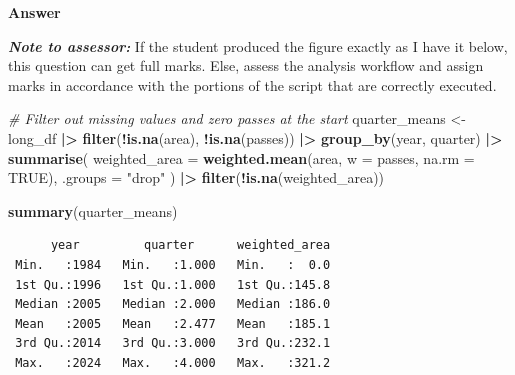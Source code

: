 \documentclass[
  british,
  10pt,
]{article}
\newenvironment{Shaded}{\begin{snugshade}}{\end{snugshade}}
\newcommand{\AttributeTok}[1]{\textcolor[rgb]{0.13,0.29,0.53}{#1}}
\newcommand{\CommentTok}[1]{\textcolor[rgb]{0.56,0.35,0.01}{\textit{#1}}}
\newcommand{\ConstantTok}[1]{\textcolor[rgb]{0.56,0.35,0.01}{#1}}
\newcommand{\FunctionTok}[1]{\textcolor[rgb]{0.13,0.29,0.53}{\textbf{#1}}}
\newcommand{\NormalTok}[1]{#1}
\newcommand{\OtherTok}[1]{\textcolor[rgb]{0.56,0.35,0.01}{#1}}
\newcommand{\SpecialCharTok}[1]{\textcolor[rgb]{0.81,0.36,0.00}{\textbf{#1}}}
\newcommand{\StringTok}[1]{\textcolor[rgb]{0.31,0.60,0.02}{#1}}
\begin{document}
\textbf{Answer}

\textbf{\emph{Note to assessor:}} If the student produced the figure
exactly as I have it below, this question can get full marks. Else,
assess the analysis workflow and assign marks in accordance with the
portions of the script that are correctly executed.

\begin{Shaded}
\begin{Highlighting}[]
\CommentTok{\# Filter out missing values and zero passes at the start}
\NormalTok{quarter\_means }\OtherTok{\textless{}{-}}\NormalTok{ long\_df }\SpecialCharTok{|\textgreater{}} 
  \FunctionTok{filter}\NormalTok{(}\SpecialCharTok{!}\FunctionTok{is.na}\NormalTok{(area), }\SpecialCharTok{!}\FunctionTok{is.na}\NormalTok{(passes)) }\SpecialCharTok{|\textgreater{}} 
  \FunctionTok{group\_by}\NormalTok{(year, quarter) }\SpecialCharTok{|\textgreater{}} 
  \FunctionTok{summarise}\NormalTok{(}
    \AttributeTok{weighted\_area =} \FunctionTok{weighted.mean}\NormalTok{(area, }\AttributeTok{w =}\NormalTok{ passes, }\AttributeTok{na.rm =} \ConstantTok{TRUE}\NormalTok{),}
    \AttributeTok{.groups =} \StringTok{"drop"}
\NormalTok{  ) }\SpecialCharTok{|\textgreater{}} 
  \FunctionTok{filter}\NormalTok{(}\SpecialCharTok{!}\FunctionTok{is.na}\NormalTok{(weighted\_area))}

\FunctionTok{summary}\NormalTok{(quarter\_means)}
\end{Highlighting}
\end{Shaded}

\begin{verbatim}
      year         quarter      weighted_area  
 Min.   :1984   Min.   :1.000   Min.   :  0.0  
 1st Qu.:1996   1st Qu.:1.000   1st Qu.:145.8  
 Median :2005   Median :2.000   Median :186.0  
 Mean   :2005   Mean   :2.477   Mean   :185.1  
 3rd Qu.:2014   3rd Qu.:3.000   3rd Qu.:232.1  
 Max.   :2024   Max.   :4.000   Max.   :321.2  
\end{verbatim}
\end{document}
